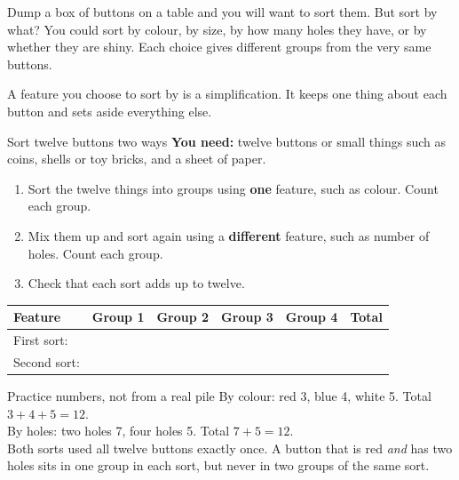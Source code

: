 \label{ch1}

Dump a box of buttons on a table and you will want to sort them. But sort by what? You could sort by colour, by size, by how many holes they have, or by whether they are shiny. Each choice gives different groups from the very same buttons.

A feature you choose to sort by is a simplification. It keeps one thing about each button and sets aside everything else.

\begin{tryit}{Sort twelve buttons two ways}
\textbf{You need:} twelve buttons or small things such as coins, shells or toy bricks, and a sheet of paper.
\begin{enumerate}[leftmargin=1.6em]
\item Sort the twelve things into groups using \textbf{one} feature, such as colour. Count each group.
\item Mix them up and sort again using a \textbf{different} feature, such as number of holes. Count each group.
\item Check that each sort adds up to twelve.
\end{enumerate}
\par\medskip
\renewcommand{\arraystretch}{1.6}
\begin{tabular}{|l|c|c|c|c|c|}
\hline
\textbf{Feature} & \textbf{Group 1} & \textbf{Group 2} & \textbf{Group 3} & \textbf{Group 4} & \textbf{Total}\\ \hline
First sort: & & & & & \\ \hline
Second sort: & & & & & \\ \hline
\end{tabular}
\end{tryit}

\begin{worked}{Practice numbers, not from a real pile}
By colour: red 3, blue 4, white 5. Total $3+4+5=12$.\\
By holes: two holes 7, four holes 5. Total $7+5=12$.\\
Both sorts used all twelve buttons exactly once. A button that is red \emph{and} has two holes sits in one group in each sort, but never in two groups of the same sort.
\end{worked}

\begin{center}
\end{center}

